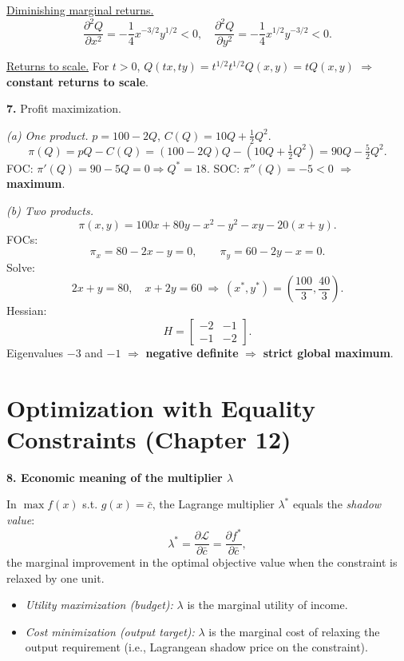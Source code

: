 \documentclass[12pt]{article}
\begin{document}
\underline{Diminishing marginal returns.}
\[
\frac{\partial^2 Q}{\partial x^2}=-\frac{1}{4}x^{-3/2}y^{1/2}<0,\quad 
\frac{\partial^2 Q}{\partial y^2}=-\frac{1}{4}x^{1/2}y^{-3/2}<0.
\]

\underline{Returns to scale.}
For $t>0$, $Q(tx,ty)=t^{1/2}t^{1/2}Q(x,y)=tQ(x,y)$ $\Rightarrow$ \textbf{constant returns to scale}.

\medskip

\textbf{7.} Profit maximization.

\textit{(a) One product.} $p=100-2Q$, $C(Q)=10Q+\tfrac12 Q^2$.
\[
\pi(Q)=pQ-C(Q)=(100-2Q)Q-(10Q+\tfrac12 Q^2)=90Q-\tfrac{5}{2}Q^2.
\]
FOC: $\pi'(Q)=90-5Q=0\Rightarrow Q^\ast=18$. SOC: $\pi''(Q)=-5<0$ $\Rightarrow$ \textbf{maximum}.

\textit{(b) Two products.} 
\[
\pi(x,y)=100x+80y -x^2-y^2-xy -20(x+y).
\]
FOCs:
\[
\pi_x=80-2x-y=0,\qquad \pi_y=60-2y-x=0.
\]
Solve:
\[
2x+y=80,\quad x+2y=60 \ \Rightarrow\ (x^\ast,y^\ast)=\left(\frac{100}{3},\frac{40}{3}\right).
\]
Hessian:
\[
H=\begin{bmatrix}-2&-1\\-1&-2\end{bmatrix}.
\]
Eigenvalues $-3$ and $-1$ $\Rightarrow$ \textbf{negative definite} $\Rightarrow$ \textbf{strict global maximum}.


\newpage

\section*{Optimization with Equality Constraints (Chapter 12)}

\textbf{8. Economic meaning of the multiplier $\lambda$}

In $\max f(x)$ s.t. $g(x)=\bar{c}$, the Lagrange multiplier $\lambda^\ast$ equals the \emph{shadow value}:
\[
\lambda^\ast=\frac{\partial \mathcal{L}}{\partial \bar{c}}=\frac{\partial f^\ast}{\partial \bar{c}},
\]
the marginal improvement in the optimal objective value when the constraint is relaxed by one unit.
\begin{itemize}
\item \textit{Utility maximization (budget):} $\lambda$ is the marginal utility of income.
\item \textit{Cost minimization (output target):} $\lambda$ is the marginal cost of relaxing the output requirement (i.e., Lagrangean shadow price on the constraint).
\end{itemize}

\medskip
\end{document}
